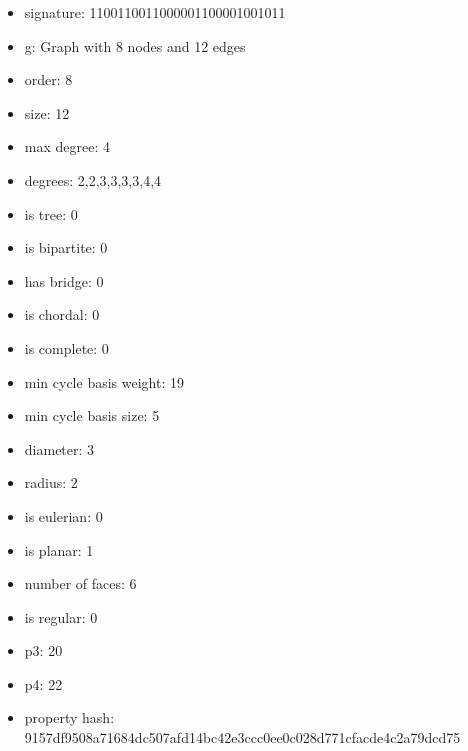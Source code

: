 \begin{itemize}
\item signature: 1100110011000001100001001011
\item g: Graph with 8 nodes and 12 edges
\item order: 8
\item size: 12
\item max degree: 4
\item degrees: 2,2,3,3,3,3,4,4
\item is tree: 0
\item is bipartite: 0
\item has bridge: 0
\item is chordal: 0
\item is complete: 0
\item min cycle basis weight: 19
\item min cycle basis size: 5
\item diameter: 3
\item radius: 2
\item is eulerian: 0
\item is planar: 1
\item number of faces: 6
\item is regular: 0
\item p3: 20
\item p4: 22
\item property hash: 9157df9508a71684dc507afd14bc42e3ccc0ee0c028d771cfacde4c2a79dcd75
\end{itemize}
\newpage
\begin{figure}
\end{figure}
